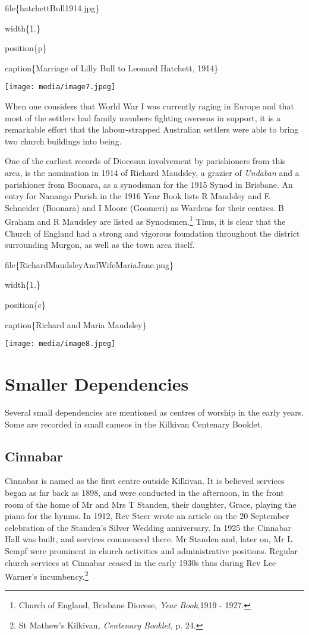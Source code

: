 file\{hatchettBull1914.jpg\}

width\{1.\}

position\{p\}

caption\{Marriage of Lilly Bull to Leonard Hatchett, 1914\}

\texttt{[image: media/image7.jpeg]}

When one considers that World War I was currently raging in Europe and that most of the settlers had family members fighting overseas in support, it is a remarkable effort that the labour-strapped Australian settlers were able to bring two church buildings into being.

One of the earliest records of Diocesan involvement by parishioners from this area, is the nomination in 1914 of Richard Maudsley, a grazier of \emph{Undaban} and a parishioner from Boonara, as a synodsman for the 1915 Synod in Brisbane. An entry for Nanango Parish in the 1916 Year Book lists R Maudsley and E Schneider (Boonara) and I Moore (Goomeri) as Wardens for their centres. B Graham and R Maudsley are listed as Synodsmen.\footnote{Church of England, Brisbane Diocese, \emph{Year Book,}1919 - 1927.} Thus, it is clear that the Church of England had a strong and vigorous foundation throughout the district surrounding Murgon, as well as the town area itself.

file\{RichardMaudsleyAndWifeMariaJane.png\}

width\{1.\}

position\{c\}

caption\{Richard and Maria Maudsley\}

\texttt{[image: media/image8.jpeg]}

\hypertarget{smaller-dependencies}{%
\section{Smaller Dependencies}\label{smaller-dependencies}}

Several small dependencies are mentioned as centres of worship in the early years. Some are recorded in small cameos in the Kilkivan Centenary Booklet.

\hypertarget{cinnabar}{%
\subsection{Cinnabar}\label{cinnabar}}

Cinnabar is named as the first centre outside Kilkivan. It is believed services began as far back as 1898, and were conducted in the afternoon, in the front room of the home of Mr and Mrs T Standen, their daughter, Grace, playing the piano for the hymns. In 1912, Rev Steer wrote an article on the 20 September celebration of the Standen's Silver Wedding anniversary. In 1925 the Cinnabar Hall was built, and services commenced there. Mr Standen and, later on, Mr L Sempf were prominent in church activities and administrative positions. Regular church services at Cinnabar ceased in the early 1930s thus during Rev Lee Warner's incumbency.\footnote{St Mathew's Kilkivan\emph{, Centenary Booklet,} p. 24.}

